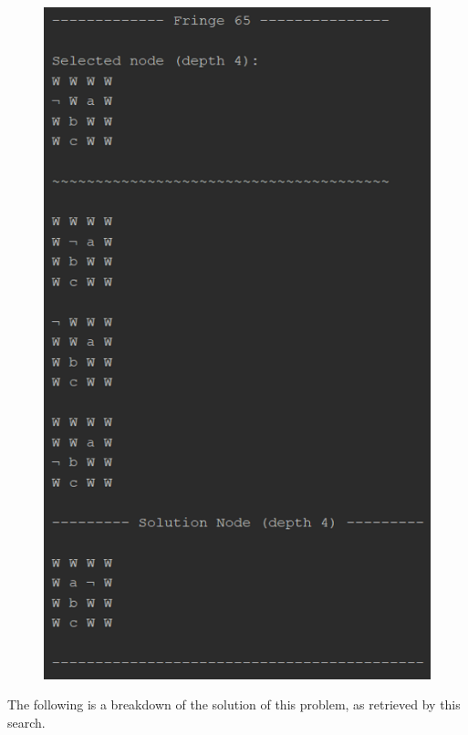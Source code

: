 \documentclass{article}
\begin{document}
	\begin{figure}[h]
		\centering
		\includegraphics[height=0.4\textheight]{BFS-1-5.png}
	\end{figure}
	
	The following is a breakdown of the solution of this problem, as retrieved by this search.
	
\end{document}
